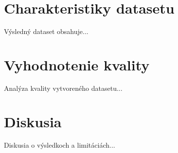 \section{Charakteristiky datasetu}

Výsledný dataset obsahuje...

\section{Vyhodnotenie kvality}

Analýza kvality vytvoreného datasetu...

\section{Diskusia}

Diskusia o výsledkoch a limitáciách...

